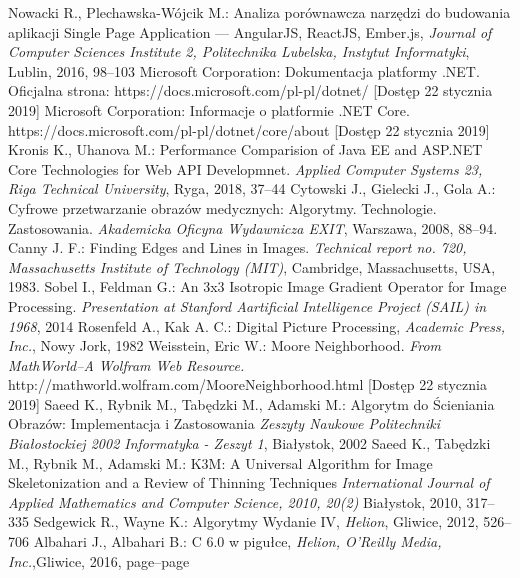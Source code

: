 \documentclass[a4paper,11pt,twoside]{report}
\theoremstyle{definition}
\begin{document}
\begin{thebibliography}{20}
 Nowacki R., Plechawska-Wójcik M.: Analiza porównawcza narzędzi do budowania aplikacji Single Page Application --- AngularJS, ReactJS, Ember.js, \emph{Journal of Computer Sciences Institute 2, Politechnika Lubelska, Instytut Informatyki}, Lublin, 2016, 98--103
 Microsoft Corporation: Dokumentacja platformy .NET. Oficjalna strona: https://docs.microsoft.com/pl-pl/dotnet/ [Dostęp 22 stycznia 2019]
 Microsoft Corporation: Informacje o platformie .NET Core. https://docs.microsoft.com/pl-pl/dotnet/core/about [Dostęp 22 stycznia 2019]
 Kronis K., Uhanova M.: Performance Comparision of Java EE and ASP.NET Core Technologies for Web API Developmnet. \emph{Applied Computer Systems 23, Riga Technical University}, Ryga, 2018, 37--44
 Cytowski J., Gielecki J., Gola A.: Cyfrowe przetwarzanie obrazów medycznych: Algorytmy. Technologie. Zastosowania. \emph{Akademicka Oficyna Wydawnicza EXIT}, Warszawa, 2008, 88--94.
 Canny J. F.: Finding Edges and Lines in Images. \emph{Technical report no. 720, Massachusetts Institute of Technology (MIT)}, Cambridge, Massachusetts, USA, 1983.
 Sobel I., Feldman G.: An 3x3 Isotropic Image Gradient Operator for Image Processing. \emph {Presentation at Stanford Aartificial Intelligence Project (SAIL) in 1968}, 2014 
 Rosenfeld A., Kak A. C.: Digital Picture Processing, \emph{Academic Press, Inc.}, Nowy Jork, 1982
  Weisstein, Eric W.: Moore Neighborhood. \emph{From MathWorld--A Wolfram Web Resource.} http://mathworld.wolfram.com/MooreNeighborhood.html  [Dostęp 22 stycznia 2019]
 Saeed K., Rybnik M., Tabędzki M., Adamski M.: Algorytm do Ścieniania Obrazów: Implementacja i Zastosowania \emph{Zeszyty Naukowe Politechniki Białostockiej 2002 Informatyka - Zeszyt 1}, Białystok, 2002
 Saeed K., Tabędzki M., Rybnik M., Adamski M.: K3M: A Universal Algorithm for Image Skeletonization and a Review of Thinning Techniques \emph{International Journal of Applied Mathematics and Computer Science, 2010, 20(2)} Białystok, 2010, 317--335
 Sedgewick R., Wayne K.: Algorytmy Wydanie IV, \emph{Helion}, Gliwice, 2012, 526--706
 Albahari J., Albahari B.: C 6.0 w pigułce, \emph{Helion, O'Reilly Media, Inc.},Gliwice, 2016, page--page 
\end{thebibliography}
\end{document}
